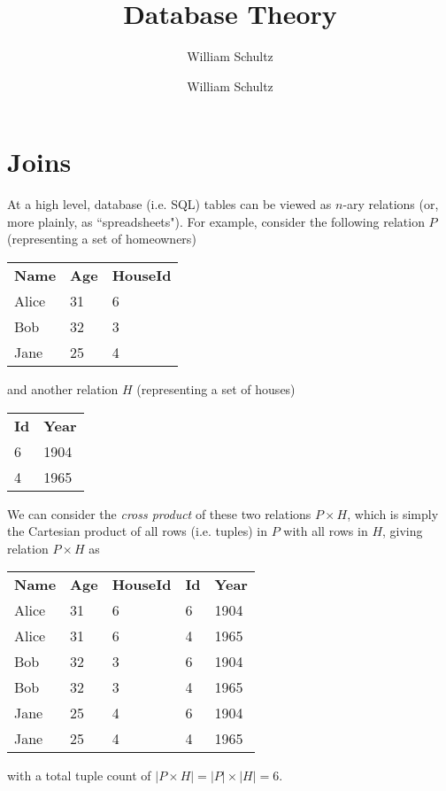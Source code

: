 \documentclass[10pt,a4paper]{article}
\author{William Schultz}
\begin{document}
\title{Database Theory}
\author{William Schultz}
\maketitle

\section*{Joins}

At a high level, database (i.e. SQL) tables can be viewed as $n$-ary relations (or, more plainly, as ``spreadsheets"). For example, consider the following relation $P$ (representing a set of homeowners)
\begin{center}
\begin{tabular}{| l | l | l |}
     \textbf{Name} & \textbf{Age} & \textbf{HouseId} \\ 
     Alice & 31 & 6 \\  
     Bob & 32 & 3 \\    
     Jane & 25 & 4    
\end{tabular}
\end{center}
and another relation $H$ (representing a set of houses)
\begin{center}
    \begin{tabular}{| l | l |}
         \textbf{Id} & \textbf{Year} \\ 
         6 & 1904 \\ 
         4 & 1965 
\end{tabular}
\end{center}
We can consider the \textit{cross product} of these two relations $P \times H$, which is simply the Cartesian product of all rows (i.e. tuples) in $P$ with all rows in $H$, giving relation $P \times H$ as
\begin{center}
    \begin{tabular}{| l | l | l | l | l |}
        \textbf{Name} & \textbf{Age}& \textbf{HouseId} & \textbf{Id} & \textbf{Year} \\
        Alice & 31 & 6 & 6 & 1904\\  
        Alice & 31 & 6 & 4 & 1965 \\  
        Bob & 32 & 3 & 6 & 1904 \\    
        Bob & 32 & 3 & 4 & 1965  \\    
        Jane & 25 & 4 & 6 & 1904  \\
        Jane & 25 & 4 & 4 & 1965   
\end{tabular}
\end{center}
with a total tuple count of $|P \times H| = |P| \times |H| = 6$.
\end{document}
